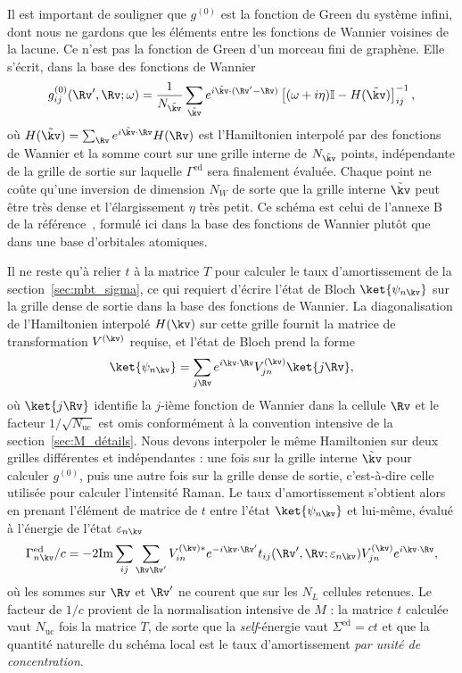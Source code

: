 Il est important de souligner que $g^{(0)}$ est la fonction de Green du système infini, dont nous ne gardons que les éléments entre les fonctions de Wannier voisines de la lacune. Ce n'est pas la fonction de Green d'un morceau fini de graphène. Elle s'écrit, dans la base des fonctions de Wannier
\begin{equation}
g^{(0)}_{ij}(\Rv',\Rv;\omega) = \frac{1}{N_{\tilde\kv}}\sum_{\tilde \kv} e^{i\tilde\kv\cdot(\Rv'-\Rv)}\left[(\omega+i\eta)\mathbb{I}-H(\tilde\kv)\right]^{-1}_{ij},\label{eqn:g_loc}
\end{equation}
où $H(\tilde\kv)=\sum_\Rv e^{i\tilde\kv\cdot\Rv}H(\Rv)$ est l'Hamiltonien interpolé par des fonctions de Wannier et la somme court sur une grille interne de $N_{\tilde\kv}$ points, indépendante de la grille de sortie sur laquelle $\Gamma^\text{ed}$ sera finalement évaluée. Chaque point ne coûte qu'une inversion de dimension $N_W$ de sorte que la grille interne $\tilde\kv$ peut être très dense et l'élargissement $\eta$ très petit. Ce schéma est celui de l'annexe B de la référence~\cite{kaasbjergAtomisticMatrixTheory2020}, formulé ici dans la base des fonctions de Wannier plutôt que dans une base d'orbitales atomiques.

Il ne reste qu'à relier $t$ à la matrice $T$ pour calculer le taux d'amortissement de la section~\ref{sec:mbt_sigma}, ce qui requiert d'écrire l'état de Bloch $\ket{\psi_{n\kv}}$ sur la grille dense de sortie dans la base des fonctions de Wannier. La diagonalisation de l'Hamiltonien interpolé $H(\kv)$ sur cette grille fournit la matrice de transformation $V^{(\kv)}$ requise, et l'état de Bloch prend la forme
\begin{equation}
    \ket{\psi_{n\kv}} = \sum_{j\Rv} e^{i\kv\cdot\Rv}V^{(\kv)}_{jn}\ket{j\Rv},\label{eqn:Bloch_Wannier}
\end{equation}
où $\ket{j\Rv}$ identifie la $j$-ième fonction de Wannier dans la cellule $\Rv$ et le facteur $1/\sqrt{N_\text{uc}}$ est omis conformément à la convention intensive de la section~\ref{sec:M_détails}. Nous devons interpoler le même Hamiltonien sur deux grilles différentes et indépendantes : une fois sur la grille interne $\tilde\kv$ pour calculer $g^{(0)}$, puis une autre fois sur la grille dense de sortie, c'est-à-dire celle utilisée pour calculer l'intensité Raman. Le taux d'amortissement s'obtient alors en prenant l'élément de matrice de $t$ entre l'état $\ket{\psi_{n\kv}}$ et lui-même, évalué à l'énergie de l'état $\varepsilon_{n\kv}$
\begin{equation}
    \Gamma_{n\kv}^\text{ed}/c = -2\mathrm{Im}\sum_{ij}\sum_{\Rv\Rv'}V_{in}^{(\kv)*}e^{-i\kv\cdot\Rv'}t_{ij}(\Rv',\Rv;\varepsilon_{n\kv})V^{(\kv)}_{jn}e^{i\kv\cdot\Rv},\label{eqn:gamma_loc}
\end{equation}
où les sommes sur $\Rv$ et $\Rv'$ ne courent que sur les $N_L$ cellules retenues. Le facteur de $1/c$ provient de la normalisation intensive de $M$ : la matrice $t$ calculée vaut $N_\text{uc}$ fois la matrice $T$, de sorte que la \textit{self}-énergie vaut $\Sigma^{\text{ed}}=ct$ et que la quantité naturelle du schéma local est le taux d'amortissement \textit{par unité de concentration}.

